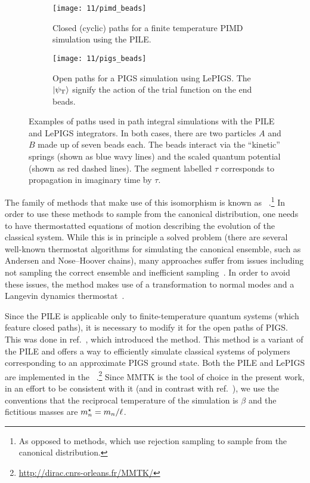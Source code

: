 \begin{figure}
	\begin{subfigure}[b]{\textwidth}
		\centering
		\texttt{[image: 11/pimd\_beads]}
		\caption{
			Closed (cyclic) paths for a finite temperature PIMD simulation using the PILE.
		}
		\vspace{4 mm}
	\end{subfigure}
	\begin{subfigure}[b]{\textwidth}
		\centering
		\texttt{[image: 11/pigs\_beads]}
		\caption{
			Open paths for a PIGS simulation using LePIGS.
			The $\ket{\psi_\mathrm{T}}$ signify the action of the trial function on the end beads.
		}
	\end{subfigure}
	\caption[
		Examples of paths used in path integral simulations
	]{
		Examples of paths used in path integral simulations with the PILE and LePIGS integrators.
		In both cases, there are two particles $A$ and $B$ made up of seven beads each.
		The beads interact via the ``kinetic'' springs (shown as blue wavy lines) and the scaled quantum potential (shown as red dashed lines).
		The segment labelled $\tau$ corresponds to propagation in imaginary time by $\tau$.
	}
	\label{fig:beads}
\end{figure}

The family of methods that make use of this isomorphism is known as ~\cite[471,479]{tuckerman2010statistical}.\footnote{
	As opposed to  methods, which use rejection sampling to sample from the canonical distribution.
}
In order to use these methods to sample from the canonical distribution, one needs to have thermostatted equations of motion describing the evolution of the classical system.
While this is in principle a solved problem (there are several well-known thermostat algorithms for simulating the canonical ensemble, such as Andersen and Nose--Hoover chains), many approaches suffer from issues including not sampling the correct ensemble and inefficient sampling~\cite{bussi2007accurate,ceriotti2010efficient}.
In order to avoid these issues, the  method makes use of a transformation to normal modes and a Langevin dynamics thermostat~\cite{ceriotti2010efficient}.

Since the PILE is applicable only to finite-temperature quantum systems (which feature closed paths), it is necessary to modify it for the open paths of PIGS.
This was done in ref.~\cite{constable2013langevin}, which introduced the  method. 
This method is a variant of the PILE and offers a way to efficiently simulate classical systems of polymers corresponding to an approximate PIGS ground state.
Both the PILE and LePIGS are implemented in the ~\cite{hinsen2000molecular}.\footnote{
	\url{http://dirac.cnrs-orleans.fr/MMTK/}
}
Since MMTK is the tool of choice in the present work, in an effort to be consistent with it (and in contrast with ref.~\cite{ceriotti2010efficient}), we use the conventions that the reciprocal temperature of the simulation is $\beta$ and the fictitious masses are ${m}^\star_n = m_n / \ell$.

